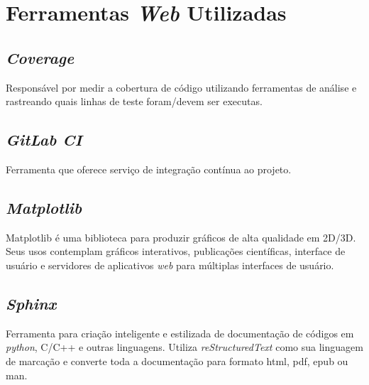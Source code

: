 \section{Ferramentas \textit{Web} Utilizadas}
    \subsection{\textit{Coverage}}
    Responsável por medir a cobertura de código utilizando ferramentas de análise e rastreando quais
    linhas de teste foram/devem ser executas.

    \subsection{\textit{GitLab CI}}
    Ferramenta que oferece serviço de integração contínua ao projeto.

    \subsection{\textit{Matplotlib}}
    Matplotlib é uma biblioteca para produzir gráficos de alta qualidade em 2D/3D. Seus usos contemplam gráficos interativos, publicações científicas, interface de usuário e servidores de aplicativos \textit{web} para múltiplas interfaces de usuário.

    \subsection{\textit{Sphinx}}
    Ferramenta para criação inteligente e estilizada de documentação de códigos em \textit{python}, C/C++
    e outras linguagens. Utiliza \textit{reStructuredText} como sua linguagem de marcação e converte toda a documentação para formato html, pdf, epub ou man.
